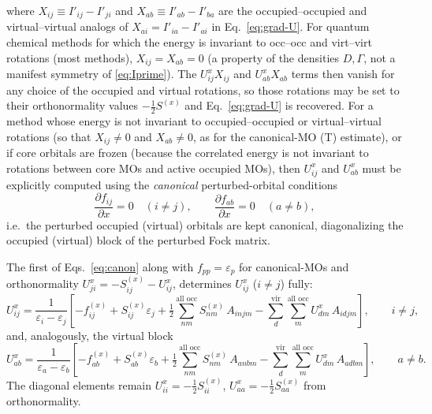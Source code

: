 \documentclass[12pt]{article}
\newcommand{\vir}{\text{vir}}
\newcommand{\alloc}{\text{all occ}}   %
\begin{document}
where $X_{ij}\equiv I'_{ij}-I'_{ji}$ and $X_{ab}\equiv I'_{ab}-I'_{ba}$ are the
occupied--occupied and virtual--virtual analogs of $X_{ai}=I'_{ia}-I'_{ai}$ in
Eq.~\eqref{eq:grad-U}.  For quantum chemical methods for which the energy is invariant to occ--occ and
virt--virt rotations (most methods), $X_{ij}=X_{ab}=0$ (a property of the 
densities $D,\Gamma$, not a manifest symmetry of \eqref{eq:Iprime}).  The
$U^x_{ij}X_{ij}$ and $U^x_{ab}X_{ab}$ terms then vanish for any choice of the
occupied and virtual rotations, so those rotations may be set to their
orthonormality values $-\tfrac12 S^{(x)}$ and Eq.~\eqref{eq:grad-U} is recovered.
For a method whose energy is not invariant to occupied--occupied or
virtual--virtual rotations (so that $X_{ij}\neq0$ and $X_{ab}\neq0$, as for the
canonical-MO (T) estimate\cite{Lee91,Hald03:gradients}), or if core orbitals are
frozen (because the correlated energy is not invariant to rotations between core
MOs and active occupied MOs), then $U^x_{ij}$ and $U^x_{ab}$ must be explicitly
computed using the {\em canonical} perturbed-orbital conditions
\begin{equation}
\frac{\partial f_{ij}}{\partial x}=0 \quad(i\neq j),\qquad
\frac{\partial f_{ab}}{\partial x}=0 \quad(a\neq b),
\label{eq:canon}
\end{equation}
i.e.\ the perturbed occupied (virtual) orbitals are kept canonical, diagonalizing
the occupied (virtual) block of the perturbed Fock matrix.

\noindent
The first of Eqs.~\eqref{eq:canon} along with $f_{pp}=\varepsilon_p$
for canonical-MOs and orthonormality $U^x_{ji}=-S^{(x)}_{ij}-U^x_{ij}$,
determines $U^x_{ij}$ ($i\neq j$) fully:
\begin{equation}
U^x_{ij}
= \frac{1}{\varepsilon_i-\varepsilon_j}\left[
-f^{(x)}_{ij} + S^{(x)}_{ij}\varepsilon_j
+ \tfrac12\sum_{nm}^{\alloc} S^{(x)}_{nm}\,A_{injm}
- \sum_{d}^{\vir}\sum_{m}^{\alloc} U^x_{dm}\,A_{idjm}
\right], \qquad i\neq j,
\label{eq:canon-oo}
\end{equation}
and, analogously, the virtual block
\begin{equation}
U^x_{ab}
= \frac{1}{\varepsilon_a-\varepsilon_b}\left[
-f^{(x)}_{ab} + S^{(x)}_{ab}\varepsilon_b
+ \tfrac12\sum_{nm}^{\alloc} S^{(x)}_{nm}\,A_{anbm}
- \sum_{d}^{\vir}\sum_{m}^{\alloc} U^x_{dm}\,A_{adbm}
\right], \qquad a\neq b.
\label{eq:canon-vv}
\end{equation}
The diagonal elements remain $U^x_{ii}=-\tfrac12 S^{(x)}_{ii}$,
$U^x_{aa}=-\tfrac12 S^{(x)}_{aa}$ from orthonormality.  
\end{document}
